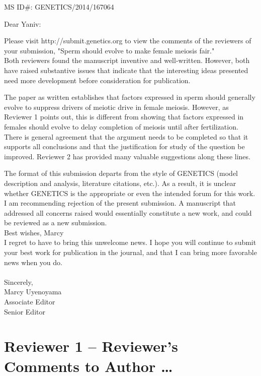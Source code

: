 \documentclass[12pt,letterpaper]{article}
\begin{document}
MS ID\#: GENETICS/2014/167064

Dear Yaniv: 

Please visit http://submit.genetics.org to view the comments of the reviewers of your submission, "Sperm should evolve to make female meiosis fair." \\

Both reviewers found the manuscript inventive and well-written.  However, both have raised substantive issues that indicate that the interesting ideas presented need more development before consideration for publication. 

The paper as written establishes that factors expressed in sperm should generally evolve to suppress drivers of meiotic drive in female meiosis.  However, as Reviewer 1 points out, this is different from showing that factors expressed in females should evolve to delay completion of meiosis until after fertilization.  There is general agreement that the argument needs to be completed so that it supports all conclusions and that the justification for study of the question be improved.  Reviewer 2 has provided many valuable suggestions along these lines. 

The format of this submission departs from the style of GENETICS (model description and analysis, literature citations, etc.).  As a result, it is unclear whether GENETICS is the appropriate or even the intended forum for this work.  I am recommending rejection of the present submission.  A manuscript that addressed all concerns raised would essentially constitute a new work, and could be reviewed as a new submission. \\
Best wishes,
Marcy
\\
I regret to have to bring this unwelcome news.  I hope you will continue to submit your best work for publication in the journal, and that I can bring more favorable news when you do.
\\ \\
Sincerely,\\
Marcy Uyenoyama\\
Associate Editor\\
Senior Editor
\newpage




\section*{Reviewer 1 -- Reviewer's Comments to Author \dots}
\end{document}
